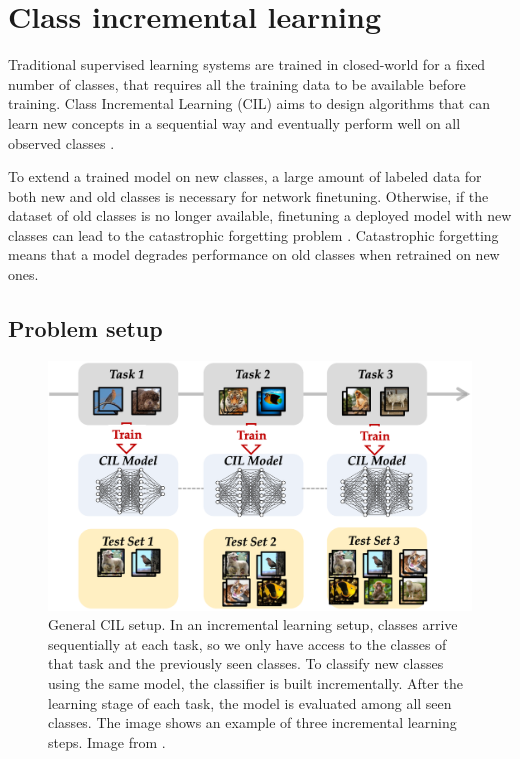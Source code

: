 \section{Class incremental learning}
Traditional supervised learning systems are trained in closed-world for a fixed
number of classes, that requires all the training data to be available before training.
Class Incremental Learning (CIL) aims to design algorithms that can learn new concepts in a sequential way and eventually perform well on all observed classes \cite{yan2021dynamically}.

To extend a trained model on new classes, a large amount of labeled data for both new
and old classes is necessary for network finetuning. Otherwise, if the dataset of old classes is no
longer available, finetuning a deployed model with
new classes can lead to the catastrophic forgetting
problem \cite{serra2018overcoming, zhang2021few, mccloskey1989catastrophic}. Catastrophic forgetting means that a model degrades performance on old classes when retrained on new ones.

\subsection{Problem setup}


\begin{figure}
    \begin{center}
        \includegraphics[width=0.9\columnwidth]{images/cil-setup.png}
    \end{center}
    \caption{General CIL setup. In an incremental learning setup, classes arrive sequentially at each task, so we only have access to the classes of that task and the previously seen classes. To classify new classes using the same model, the classifier is built incrementally. After the learning stage of each task, the model
    is evaluated among all seen classes. The image shows an example of three incremental learning steps. Image from \cite{zhou2021pycil}.}
    \label{fig:cil-setup}
\end{figure}

